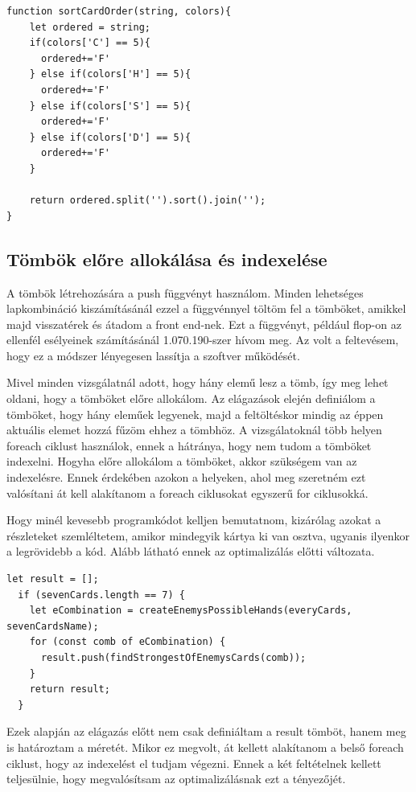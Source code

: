 \begin{lstlisting}[style=htmlcssjs]
function sortCardOrder(string, colors){
    let ordered = string;
    if(colors['C'] == 5){
      ordered+='F'
    } else if(colors['H'] == 5){
      ordered+='F'
    } else if(colors['S'] == 5){
      ordered+='F'
    } else if(colors['D'] == 5){
      ordered+='F'
    }
  
    return ordered.split('').sort().join('');
}
\end{lstlisting}

\subsection{Tömbök előre allokálása és indexelése}
A tömbök létrehozására a push függvényt használom. Minden lehetséges lapkombináció kiszámításánál ezzel a függvénnyel töltöm fel a tömböket, amikkel majd visszatérek és átadom a front end-nek. Ezt a függvényt, például flop-on az ellenfél esélyeinek számításánál 1.070.190-szer hívom meg. Az volt a feltevésem, hogy ez a módszer lényegesen lassítja a szoftver működését.

Mivel minden vizsgálatnál adott, hogy hány elemű lesz a tömb, így meg lehet oldani, hogy a tömböket előre allokálom. Az elágazások elején definiálom a tömböket, hogy hány eleműek legyenek, majd a feltöltéskor mindig az éppen aktuális elemet hozzá fűzöm ehhez a tömbhöz. A vizsgálatoknál több helyen foreach ciklust használok, ennek a hátránya, hogy nem tudom a tömböket indexelni. Hogyha előre allokálom a tömböket, akkor szükségem van az indexelésre. Ennek érdekében azokon a helyeken, ahol meg szeretném ezt valósítani át kell alakítanom a foreach ciklusokat egyszerű for ciklusokká.

Hogy minél kevesebb programkódot kelljen bemutatnom, kizárólag azokat a részleteket szemléltetem, amikor mindegyik kártya ki van osztva, ugyanis ilyenkor a legrövidebb a kód. Alább látható ennek az optimalizálás előtti változata.

\begin{lstlisting}[style=htmlcssjs]
  let result = [];
  if (sevenCards.length == 7) {
    let eCombination = createEnemysPossibleHands(everyCards, sevenCardsName);
    for (const comb of eCombination) {
      result.push(findStrongestOfEnemysCards(comb));
    }
    return result;
  }
\end{lstlisting}

Ezek alapján az elágazás előtt nem csak definiáltam a result tömböt, hanem meg is határoztam a méretét. Mikor ez megvolt, át kellett alakítanom a belső foreach ciklust, hogy az indexelést el tudjam végezni. Ennek a két feltételnek kellett teljesülnie, hogy megvalósítsam az optimalizálásnak ezt a tényezőjét.

